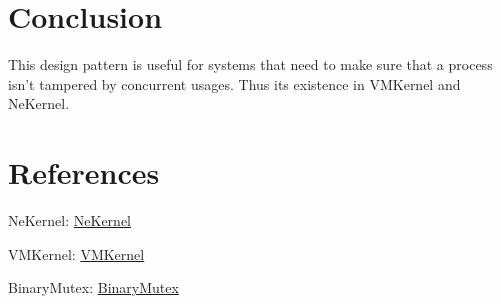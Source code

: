 \documentclass{article}
\begin{document}
\section{Conclusion}

{This design pattern is useful for systems that need to make sure that a process isn't tampered by concurrent usages.
Thus its existence in VMKernel and NeKernel.}

\section{References}

{NeKernel}: \href{https://github.com/nekernel-org/nekernel}{NeKernel}

{VMKernel}: \href{https://snu.systems/specs/vmkernel}{VMKernel}

{BinaryMutex}: \href{https://github.com/nekernel-org/nekernel/blob/dev/dev/kernel/KernelKit/BinaryMutex.h}{BinaryMutex}
\end{document}
